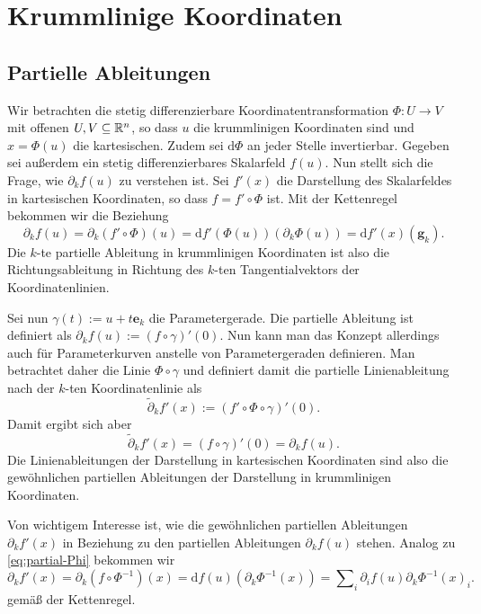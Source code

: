 
\chapter{Krummlinige Koordinaten}

\section{Partielle Ableitungen}

Wir betrachten die stetig differenzierbare Koordinatentransformation
$\Phi\colon U\to V$ mit offenen $U,V\subseteq\mathbb R^n$, so dass
$u$ die krummlinigen Koordinaten sind und $x = \Phi(u)$ die
kartesischen. Zudem sei $\mathrm d\Phi$ an jeder Stelle
invertierbar. Gegeben sei außerdem ein stetig differenzierbares
Skalarfeld $f(u)$. Nun stellt sich die Frage, wie $\partial_k f(u)$ zu
verstehen ist. Sei $f'(x)$ die Darstellung des Skalarfeldes in
kartesischen Koordinaten, so dass $f = f'\circ\Phi$ ist. Mit der
Kettenregel bekommen wir die Beziehung
\begin{equation}\label{eq:partial-Phi}
\partial_k f(u) = \partial_k (f'\circ\Phi)(u)
= \mathrm df'(\Phi(u))(\partial_k\Phi(u))
= \mathrm df'(x)(\mathbf g_k).
\end{equation}
Die $k$-te partielle Ableitung in krummlinigen Koordinaten ist also
die Richtungsableitung in Richtung des $k$-ten Tangentialvektors der
Koordinatenlinien.

Sei nun $\gamma(t):=u+t\mathbf e_k$ die Parametergerade. Die
partielle Ableitung ist definiert als
$\partial_k f(u):=(f\circ\gamma)'(0)$. Nun kann man das Konzept
allerdings auch für Parameterkurven anstelle von Parametergeraden
definieren. Man betrachtet daher die Linie $\Phi\circ\gamma$ und
definiert damit die partielle Linienableitung nach der $k$-ten
Koordinatenlinie als
\begin{equation}
\tilde\partial_k f'(x) := (f'\circ\Phi\circ\gamma)'(0).
\end{equation}
Damit ergibt sich aber
\begin{equation}
\tilde\partial_k f'(x) = (f\circ\gamma)'(0) = \partial_k f(u).
\end{equation}
Die Linienableitungen der Darstellung in kartesischen Koordinaten sind
also die gewöhnlichen partiellen Ableitungen der Darstellung in
krummlinigen Koordinaten.

Von wichtigem Interesse ist, wie die gewöhnlichen partiellen
Ableitungen $\partial_k f'(x)$ in Beziehung zu den partiellen
Ableitungen $\partial_k f(u)$ stehen. Analog zu \eqref{eq:partial-Phi}
bekommen wir
\begin{equation}
\partial_k f'(x) = \partial_k(f\circ\Phi^{-1})(x)
= \mathrm df(u)(\partial_k\Phi^{-1}(x))
= \sum\nolimits_i\partial_i f(u)\partial_k\Phi^{-1}(x)_i.
\end{equation}
gemäß der Kettenregel.

